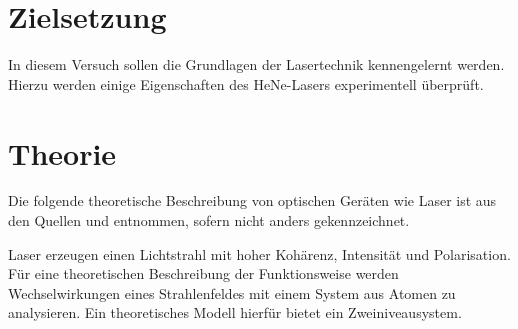\section{Zielsetzung}
\label{sec:Zielsetzung}

In diesem Versuch sollen die Grundlagen der Lasertechnik kennengelernt
werden. Hierzu werden einige Eigenschaften des HeNe-Lasers experimentell
überprüft.

\section{Theorie}
\label{sec:Theorie}
Die folgende theoretische Beschreibung von optischen Geräten wie Laser ist aus den Quellen
\cite{anleitung} und \cite{eichler} entnommen,
sofern nicht anders gekennzeichnet.

Laser erzeugen einen
Lichtstrahl mit hoher Kohärenz, Intensität und Polarisation. Für eine theoretischen
Beschreibung der Funktionsweise werden Wechselwirkungen eines Strahlenfeldes mit einem
System aus Atomen zu analysieren. Ein theoretisches Modell hierfür bietet ein
Zweiniveausystem.

